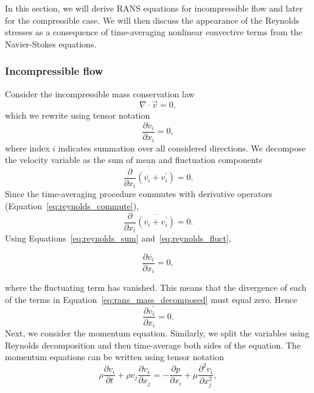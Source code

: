 In this section, we will derive RANS equations for incompressible flow and later for the compressible case. We will then discuss the appearance of the Reynolds stresses as a consequence of time-averaging nonlinear convective terms from the Navier-Stokes equations.

\subsubsection{Incompressible flow}

Consider the incompressible mass conservation law
\begin{equation}
    \nabla\cdot\vec{v} = 0,
\end{equation}
which we rewrite using tensor notation
\begin{equation}
    \frac{\partial v_i}{\partial x_i} = 0,
\end{equation}
where index $i$ indicates summation over all considered directions. We decompose the velocity variable as the sum of mean and fluctuation components
\begin{equation}
    \overline{\frac{\partial }{\partial x_i}\left(\overline{v_i} + v_i^\prime\right)} = 0.
\end{equation}
Since the time-averaging procedure commutes with derivative operators (Equation~\ref{eq:reynolds_commute}),
\begin{equation}
    \label{eq:rans_mass_decomposed}
    \frac{\partial}{\partial x_i} \overline{\left(\overline{v_i} + v_i^\prime\right)} = 0.
\end{equation}
Using Equations~\ref{eq:reynolds_sum} and~\ref{eq:reynolds_fluct},
\begin{eqBox}
\begin{equation}
    \frac{\partial \overline{v_i}}{\partial x_i} = 0,
\end{equation}
\end{eqBox}
where the fluctuating term has vanished. This means that the divergence of each of the terms in Equation~\ref{eq:rans_mass_decomposed} must equal zero. Hence
\begin{equation}
    \frac{\partial v_i^\prime}{\partial x_i} = 0.
\end{equation}
Next, we consider the momentum equation. Similarly, we split the variables using Reynolds decomposition and then time-average both sides of the equation. The momentum equations can be written using tensor notation
\begin{equation}
    \label{eq:rans_momentum_initial}
    \rho\frac{\partial v_i}{\partial t} + \rho v_j\frac{\partial v_i}{\partial x_j} =
    - \frac{\partial p}{\partial x_i} + \mu \frac{\partial^2 v_i}{\partial x_j^2},
\end{equation}

